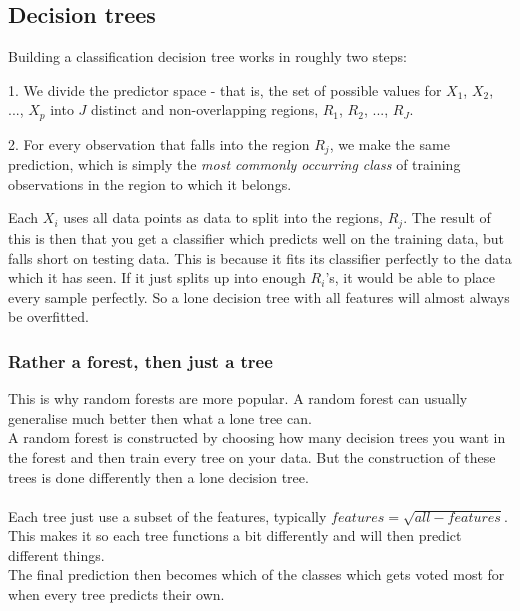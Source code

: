 \documentclass[parskip=half]{scrartcl}
\theoremstyle{definition}
\theoremstyle{remark}
\begin{document}
\subsection{Decision trees}
Building a classification decision tree works in roughly two steps:

1. We divide the predictor space - that is, the set of possible values for $X_1$, $X_2$, ..., $X_p$ into $J$ distinct and non-overlapping regions, $R_1$, $R_2$, ..., $R_J$.

2. For every observation that falls into the region $R_j$, we make the same prediction, which is simply the \emph{most commonly occurring class} of training observations in the region to which it belongs.

Each $X_i$ uses all data points as data to split into the regions, $R_j$. The result of this is then that you get a classifier which predicts well on the training data, but falls short on testing data. This is because it fits its classifier perfectly to the data which it has seen. If it just splits up into enough $R_i$'s, it would be able to place every sample perfectly. So a lone decision tree with all features will almost always be overfitted.
\subsubsection{Rather a forest, then just a tree}
This is why random forests are more popular. A random forest can usually generalise much better then what a lone tree can.\\
A random forest is constructed by choosing how many decision trees you want in the forest and then train every tree on your data. But the construction of these trees is done differently then a lone decision tree.\\
\\
Each tree just use a subset of the features, typically $ features = \sqrt{all-features}$. This makes it so each tree functions a bit differently and will then predict different things.\\
The final prediction then becomes which of the classes which gets voted most for when every tree predicts their own.
\end{document}
